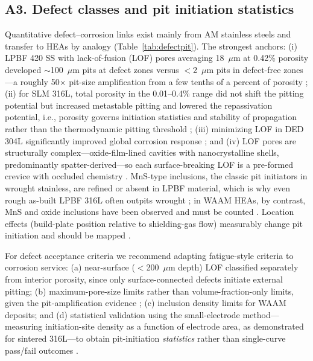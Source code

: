 \subsection{A3. Defect classes and pit initiation statistics}
\label{sec:a3}

Quantitative defect--corrosion links exist mainly from AM stainless steels and transfer to HEAs by analogy (Table~\ref{tab:defectpit}). The strongest anchors: (i) LPBF 420 SS with lack-of-fusion (LOF) pores averaging 18~$\mu$m at 0.42\% porosity developed $\sim$100~$\mu$m pits at defect zones versus $<$2~$\mu$m pits in defect-free zones---a roughly 50$\times$ pit-size amplification from a few tenths of a percent of porosity \cite{npd_am_review2026}; (ii) for SLM 316L, total porosity in the 0.01--0.4\% range did not shift the pitting potential but increased metastable pitting and lowered the repassivation potential, i.e., porosity governs initiation statistics and stability of propagation rather than the thermodynamic pitting threshold \cite{iop2024def304l}; (iii) minimizing LOF in DED 304L significantly improved global corrosion response \cite{iop2024def304l}; and (iv) LOF pores are structurally complex---oxide-film-lined cavities with nanocrystalline shells, predominantly spatter-derived---so each surface-breaking LOF is a pre-formed crevice with occluded chemistry \cite{lof2021}. MnS-type inclusions, the classic pit initiators in wrought stainless, are refined or absent in LPBF material, which is why even rough as-built LPBF 316L often outpits wrought \cite{jom_pitting_review2022}; in WAAM HEAs, by contrast, MnS and oxide inclusions have been observed and must be counted \cite{andersson2026waam}. Location effects (build-plate position relative to shielding-gas flow) measurably change pit initiation and should be mapped \cite{iop2024def304l}.

For defect acceptance criteria we recommend adapting fatigue-style criteria to corrosion service: (a) near-surface ($<$200~$\mu$m depth) LOF classified separately from interior porosity, since only surface-connected defects initiate external pitting; (b) maximum-pore-size limits rather than volume-fraction-only limits, given the pit-amplification evidence \cite{npd_am_review2026}; (c) inclusion density limits for WAAM deposits; and (d) statistical validation using the small-electrode method---measuring initiation-site density as a function of electrode area, as demonstrated for sintered 316L---to obtain pit-initiation \emph{statistics} rather than single-curve pass/fail outcomes \cite{npj_sintered2024}.

